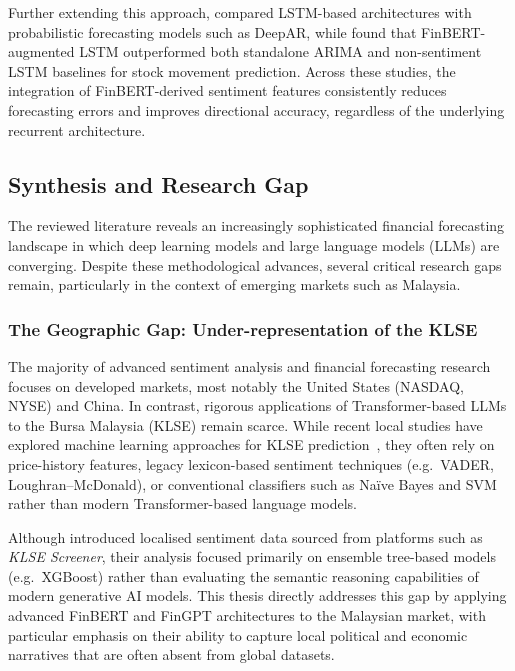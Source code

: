 \documentclass[12pt]{ucetd}
\begin{document}
Further extending this approach, \citet{soliman2025improving} compared LSTM-based architectures with probabilistic forecasting models such as DeepAR, while \citet{zeng2025finbert} found that FinBERT-augmented LSTM outperformed both standalone ARIMA and non-sentiment LSTM baselines for stock movement prediction. Across these studies, the integration of FinBERT-derived sentiment features consistently reduces forecasting errors and improves directional accuracy, regardless of the underlying recurrent architecture.



\subsection{Synthesis and Research Gap}

The reviewed literature reveals an increasingly sophisticated financial forecasting landscape in which deep learning models and large language models (LLMs) are converging. Despite these methodological advances, several critical research gaps remain, particularly in the context of emerging markets such as Malaysia.

\subsubsection{The Geographic Gap: Under-representation of the KLSE}

The majority of advanced sentiment analysis and financial forecasting research focuses on developed markets, most notably the United States (NASDAQ, NYSE) and China. In contrast, rigorous applications of Transformer-based LLMs to the Bursa Malaysia (KLSE) remain scarce. While recent local studies have explored machine learning approaches for KLSE prediction~\cite{leong2021stock, tengku2022prediction, ku2023improving}, they often rely on price-history features, legacy lexicon-based sentiment techniques (e.g.\ VADER, Loughran--McDonald), or conventional classifiers such as Na\"ive Bayes and SVM rather than modern Transformer-based language models.

Although \citet{tan2025klse} introduced localised sentiment data sourced from platforms such as \emph{KLSE Screener}, their analysis focused primarily on ensemble tree-based models (e.g.\ XGBoost) rather than evaluating the semantic reasoning capabilities of modern generative AI models. This thesis directly addresses this gap by applying advanced FinBERT and FinGPT architectures to the Malaysian market, with particular emphasis on their ability to capture local political and economic narratives that are often absent from global datasets.
\end{document}

